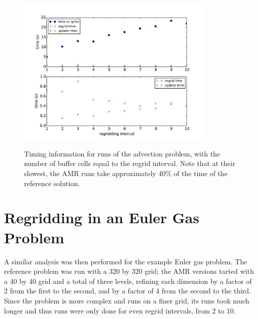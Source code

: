 \documentclass[11pt]{article}
\begin{document}
\begin{figure}[!htb]
\centering
\caption{Timing information for runs of the advection problem,
with the number of buffer cells equal to the regrid interval. Note that
at their slowest, the AMR runs take approximately 40\% of the time of the
reference solution.}
\includegraphics[width=0.85\textwidth]{myclaw/time_advec}
\label{fig:time_advec}
\end{figure}


\section*{Regridding in an Euler Gas Problem}
A similar analysis was then performed for the example Euler gas problem.
The reference problem was run with a 320 by 320 grid; the AMR versions
tarted with a 40 by 40 grid and a total of three levels, refining each 
dimension by a factor of 2 from the first to the second, and by a 
factor of 4 from the second to the third.
Since the problem is more complex and runs on a finer grid, its runs took
much longer and thus runs were only done for even regrid intervals, from
2 to 10.
\end{document}
